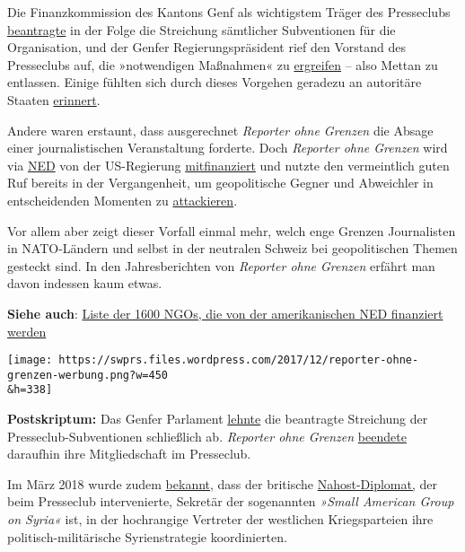 Die Finanzkommission des Kantons Genf als wichtigstem Träger des
Presseclubs
\href{https://www.letemps.ch/suisse/2017/12/01/coup-semonce-contre-club-suisse-presse}{beantragte}
in der Folge die Streichung sämtlicher Subventionen für die
Organisation, und der Genfer Regierungspräsident rief den Vorstand des
Presseclubs auf, die »notwendigen Maßnahmen« zu
\href{https://www.letemps.ch/monde/2017/11/28/club-suisse-presse-tourmente-syrienne}{ergreifen}
-- also Mettan zu entlassen. Einige fühlten sich durch dieses Vorgehen
geradezu an autoritäre Staaten
\href{https://www.tdg.ch/geneve/actu-genevoise/club-suisse-presse-perd-100-000-francs/story/11699535}{erinnert}.

Andere waren erstaunt, dass ausgerechnet \emph{Reporter ohne Grenzen}
die Absage einer journalistischen Veranstaltung forderte. Doch
\emph{Reporter ohne Grenzen} wird via
\href{http://www.voltairenet.org/article180540.html}{NED} von der
US-Regierung
\href{https://en.wikipedia.org/wiki/Reporters_Without_Borders\#Funding}{mitfinanziert}
und nutzte den vermeintlich guten Ruf bereits in der Vergangenheit, um
geopolitische Gegner und Abweichler in entscheidenden Momenten zu
\href{http://www.voltairenet.org/article165297.html}{attackieren}.

Vor allem aber zeigt dieser Vorfall einmal mehr, welch enge Grenzen
Journalisten in NATO-Ländern und selbst in der neutralen Schweiz bei
geopolitischen Themen gesteckt sind. In den Jahresberichten von
\emph{Reporter ohne Grenzen} erfährt man davon indessen kaum etwas.

\textbf{Siehe auch}:
\href{https://swprs.org/organizations-funded-by-the-ned/}{Liste der 1600
NGOs, die von der amerikanischen NED finanziert werden}

\texttt{[image: https://swprs.files.wordpress.com/2017/12/reporter-ohne-grenzen-werbung.png?w=450\\\&h=338]}

\textbf{Postskriptum:} Das Genfer Parlament
\href{https://www.letemps.ch/suisse/2017/12/15/club-suisse-presse-garde-subvention}{lehnte}
die beantragte Streichung der Presseclub-Subventionen schließlich ab.
\emph{Reporter ohne Grenzen}
\href{https://www.letemps.ch/monde/2017/12/20/une-premiere-defection-club-suisse-presse}{beendete}
daraufhin ihre Mitgliedschaft im Presseclub.

Im März 2018 wurde zudem
\href{https://www.rubikon.news/artikel/die-geplante-zerschlagung-syriens}{bekannt},
dass der britische
\href{https://twitter.com/BenJarlath/status/932644417944604672}{Nahost-Diplomat,}
der beim Presseclub intervenierte, Sekretär der sogenannten \emph{»Small
American Group on Syria«} ist, in der hochrangige Vertreter der
westlichen Kriegsparteien ihre politisch-militärische Syrienstrategie
koordinierten.

